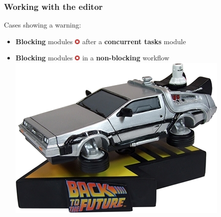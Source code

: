 \begin{frame}
    \frametitle{Working with the editor}
    Cases showing a warning:
    \begin{itemize}
        \item \textbf{Blocking} modules \includegraphics[width=10px]{pictures/blocking-module.png} after a \textbf{concurrent tasks} module
        \begin{center}
        \end{center}
        \item \textbf{Blocking} modules \includegraphics[width=10px]{pictures/blocking-module.png} in a \textbf{non-blocking} workflow \includegraphics[width=0.12\linewidth]{pictures/time-machine.png}
    \end{itemize}
\end{frame}

